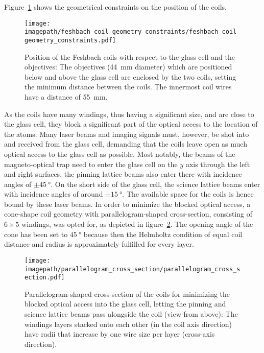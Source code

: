 Figure~\ref{fig:feshbach_coil_geometry_constraints} shows the geometrical constraints on the position of the coils.

\begin{figure}
    \centering
    \texttt{[image: \\imagepath/feshbach\_coil\_geometry\_constraints/feshbach\_coil\_geometry\_constraints.pdf]}
    \caption{Position of the Feshbach coils with respect to the glass cell and the objectives: The objectives (\SI{44}{\milli\meter} diameter) which are positioned below and above the glass cell are enclosed by the two coils, setting the minimum distance between the coils. The innermost coil wires have a distance of \SI{55}{\milli\meter}.}
    \label{fig:feshbach_coil_geometry_constraints}
\end{figure}

As the coils have many windings, thus having a significant size, and are close to the glass cell, they block a significant part of the optical access to the location of the atoms. Many laser beams and imaging signals must, however, be shot into and received from the glass cell, demanding that the coils leave open as much optical access to the glass cell as possible. Most notably, the beams of the magneto-optical trap need to enter the glass cell on the $y$ axis through the left and right surfaces, the pinning lattice beams also enter there with incidence angles of $\pm \SI{45}{\degree}$. On the short side of the glass cell, the science lattice beams enter with incidence angles of around $\pm \SI{15}{\degree}$. The available space for the coils is hence bound by these laser beams. In order to minimize the blocked optical access, a cone-shape coil geometry with parallelogram-shaped cross-section, consisting of $6 \times 5$ windings, was opted for, as depicted in figure~\ref{fig:parallelogram_cross_section}. The opening angle of the cone has been set to $\SI{45}{\degree}$ because then the Helmholtz condition of equal coil distance and radius is approximately fulfilled for every layer.
\begin{figure}
    \centering
    \texttt{[image: \\imagepath/parallelogram\_cross\_section/parallelogram\_cross\_section.pdf]}
    \caption{Parallelogram-shaped cross-section of the coils for minimizing the blocked optical access into the glass cell, letting the pinning and science lattice beams pass alongside the coil (view from above): The windings layers stacked onto each other (in the coil axis direction) have radii that increase by one wire size per layer (cross-axis direction).}
    \label{fig:parallelogram_cross_section}
\end{figure}

